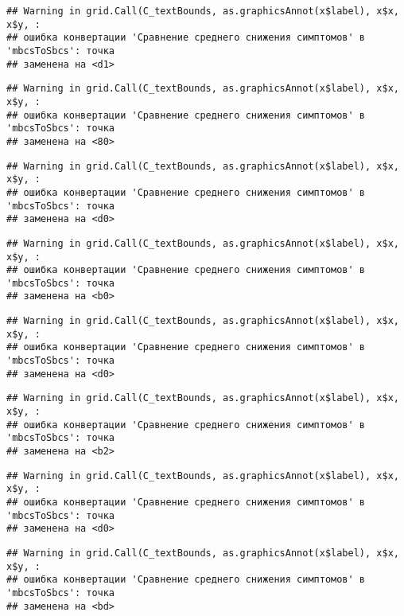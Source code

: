 \documentclass[
]{article}
\begin{document}
\begin{verbatim}
## Warning in grid.Call(C_textBounds, as.graphicsAnnot(x$label), x$x, x$y, :
## ошибка конвертации 'Сравнение среднего снижения симптомов' в 'mbcsToSbcs': точка
## заменена на <d1>
\end{verbatim}

\begin{verbatim}
## Warning in grid.Call(C_textBounds, as.graphicsAnnot(x$label), x$x, x$y, :
## ошибка конвертации 'Сравнение среднего снижения симптомов' в 'mbcsToSbcs': точка
## заменена на <80>
\end{verbatim}

\begin{verbatim}
## Warning in grid.Call(C_textBounds, as.graphicsAnnot(x$label), x$x, x$y, :
## ошибка конвертации 'Сравнение среднего снижения симптомов' в 'mbcsToSbcs': точка
## заменена на <d0>
\end{verbatim}

\begin{verbatim}
## Warning in grid.Call(C_textBounds, as.graphicsAnnot(x$label), x$x, x$y, :
## ошибка конвертации 'Сравнение среднего снижения симптомов' в 'mbcsToSbcs': точка
## заменена на <b0>
\end{verbatim}

\begin{verbatim}
## Warning in grid.Call(C_textBounds, as.graphicsAnnot(x$label), x$x, x$y, :
## ошибка конвертации 'Сравнение среднего снижения симптомов' в 'mbcsToSbcs': точка
## заменена на <d0>
\end{verbatim}

\begin{verbatim}
## Warning in grid.Call(C_textBounds, as.graphicsAnnot(x$label), x$x, x$y, :
## ошибка конвертации 'Сравнение среднего снижения симптомов' в 'mbcsToSbcs': точка
## заменена на <b2>
\end{verbatim}

\begin{verbatim}
## Warning in grid.Call(C_textBounds, as.graphicsAnnot(x$label), x$x, x$y, :
## ошибка конвертации 'Сравнение среднего снижения симптомов' в 'mbcsToSbcs': точка
## заменена на <d0>
\end{verbatim}

\begin{verbatim}
## Warning in grid.Call(C_textBounds, as.graphicsAnnot(x$label), x$x, x$y, :
## ошибка конвертации 'Сравнение среднего снижения симптомов' в 'mbcsToSbcs': точка
## заменена на <bd>
\end{verbatim}
\end{document}
